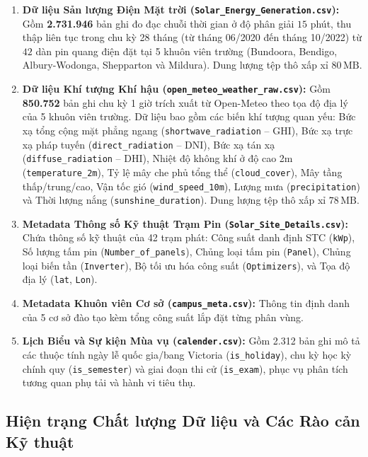 \documentclass[12pt, a4paper]{report}
\begin{document}
\begin{enumerate}[label=\arabic*., leftmargin=*]
    \item \textbf{Dữ liệu Sản lượng Điện Mặt trời (\texttt{Solar\_Energy\_Generation.csv}):} Gồm \textbf{2.731.946} bản ghi đo đạc chuỗi thời gian ở độ phân giải $15$ phút, thu thập liên tục trong chu kỳ 28 tháng (từ tháng 06/2020 đến tháng 10/2022) từ $42$ dàn pin quang điện đặt tại 5 khuôn viên trường (Bundoora, Bendigo, Albury-Wodonga, Shepparton và Mildura). Dung lượng tệp thô xấp xỉ $80\,\text{MB}$.
    
    \item \textbf{Dữ liệu Khí tượng Khí hậu (\texttt{open\_meteo\_weather\_raw.csv}):} Gồm \textbf{850.752} bản ghi chu kỳ 1 giờ trích xuất từ Open-Meteo theo tọa độ địa lý của 5 khuôn viên trường. Dữ liệu bao gồm các biến khí tượng quan yếu: Bức xạ tổng cộng mặt phẳng ngang (\texttt{shortwave\_radiation} -- GHI), Bức xạ trực xạ pháp tuyến (\texttt{direct\_radiation} -- DNI), Bức xạ tán xạ (\texttt{diffuse\_radiation} -- DHI), Nhiệt độ không khí ở độ cao 2m (\texttt{temperature\_2m}), Tỷ lệ mây che phủ tổng thể (\texttt{cloud\_cover}), Mây tầng thấp/trung/cao, Vận tốc gió (\texttt{wind\_speed\_10m}), Lượng mưa (\texttt{precipitation}) và Thời lượng nắng (\texttt{sunshine\_duration}). Dung lượng tệp thô xấp xỉ $78\,\text{MB}$.
    
    \item \textbf{Metadata Thông số Kỹ thuật Trạm Pin (\texttt{Solar\_Site\_Details.csv}):} Chứa thông số kỹ thuật của 42 trạm phát: Công suất danh định STC (\texttt{kWp}), Số lượng tấm pin (\texttt{Number\_of\_panels}), Chủng loại tấm pin (\texttt{Panel}), Chủng loại biến tần (\texttt{Inverter}), Bộ tối ưu hóa công suất (\texttt{Optimizers}), và Tọa độ địa lý (\texttt{lat}, \texttt{Lon}).
    
    \item \textbf{Metadata Khuôn viên Cơ sở (\texttt{campus\_meta.csv}):} Thông tin định danh của 5 cơ sở đào tạo kèm tổng công suất lắp đặt từng phân vùng.
    
    \item \textbf{Lịch Biểu và Sự kiện Mùa vụ (\texttt{calender.csv}):} Gồm 2.312 bản ghi mô tả các thuộc tính ngày lễ quốc gia/bang Victoria (\texttt{is\_holiday}), chu kỳ học kỳ chính quy (\texttt{is\_semester}) và giai đoạn thi cử (\texttt{is\_exam}), phục vụ phân tích tương quan phụ tải và hành vi tiêu thụ.
\end{enumerate}

\subsection{Hiện trạng Chất lượng Dữ liệu và Các Rào cản Kỹ thuật}
\end{document}
